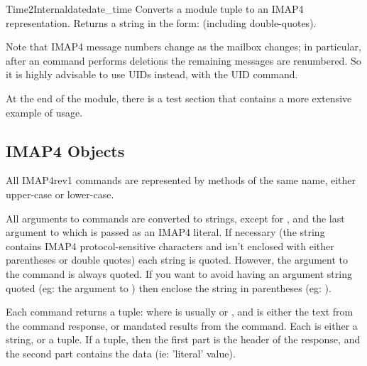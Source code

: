 \begin{funcdesc}{Time2Internaldate}{date_time}
  Converts a  module tuple to an IMAP4
   representation.  Returns a string in the form:
   (including double-quotes).
\end{funcdesc}


Note that IMAP4 message numbers change as the mailbox changes; in
particular, after an  command performs deletions the
remaining messages are renumbered. So it is highly advisable to use
UIDs instead, with the UID command.

At the end of the module, there is a test section that contains a more
extensive example of usage.

\begin{seealso}
\end{seealso}


\subsection{IMAP4 Objects \label{imap4-objects}}

All IMAP4rev1 commands are represented by methods of the same name,
either upper-case or lower-case.

All arguments to commands are converted to strings, except for
, and the last argument to  which is
passed as an IMAP4 literal.  If necessary (the string contains IMAP4
protocol-sensitive characters and isn't enclosed with either
parentheses or double quotes) each string is quoted. However, the
 argument to the  command is always quoted.
If you want to avoid having an argument string quoted
(eg: the  argument to ) then enclose the string in
parentheses (eg: ).

Each command returns a tuple:  where  is usually  or ,
and  is either the text from the command response, or
mandated results from the command. Each 
is either a string, or a tuple. If a tuple, then the first part
is the header of the response, and the second part contains
the data (ie: 'literal' value).

